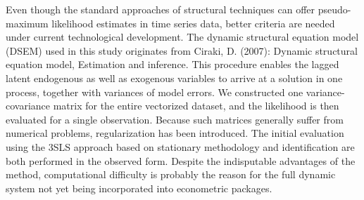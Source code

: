 
\begin{Abstrakt}
    Even though the standard approaches of structural techniques can offer pseudo-maximum likelihood estimates in time series data, better criteria are needed under current technological development. The dynamic structural equation model (DSEM) used in this study originates from Ciraki, D. (2007): Dynamic structural equation model, Estimation and inference. This procedure enables the lagged latent endogenous as well as exogenous variables to arrive at a solution in one process, together with variances of model errors. We constructed one variance-covariance matrix for the entire vectorized dataset, and the likelihood is then evaluated for a single observation. Because such matrices generally suffer from numerical problems, regularization has been introduced. The initial evaluation using the 3SLS approach based on stationary methodology and identification are both performed in the observed form. Despite the indisputable advantages of the method, computational difficulty is probably the reason for the full dynamic system not yet being incorporated into econometric packages.
\end{Abstrakt}



\clearpage